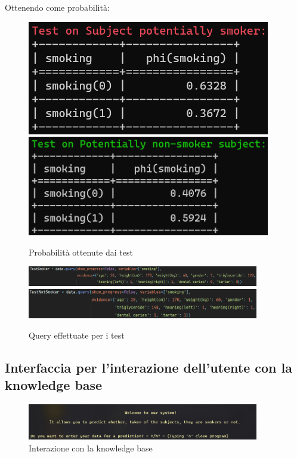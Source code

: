 \documentclass{article}
\begin{document}
\noindent
Ottenendo come probabilità:

\begin{figure}[H]
        \includegraphics[width=10.6cm]{testSmoke}
        \includegraphics[width=10.6cm]{testNotSmoke}
        \centering
        \caption{Probabilità ottenute dai test}
        \centering
\end{figure}

\begin{figure}[H]
        \includegraphics[width=0.9\textwidth]{queryTestSmok}
        \includegraphics[width=0.9\textwidth]{queryTestNotSMok}
        \centering
        \caption{Query effettuate per i test}
        \centering
\end{figure}
%

\subsection{Interfaccia per l'interazione dell'utente con la knowledge base}

\begin{figure}[H]
        \includegraphics[width=0.9\textwidth]{welcome}
        \centering
        \caption{Interazione con la knowledge base}
        \centering
\end{figure}
\end{document}
